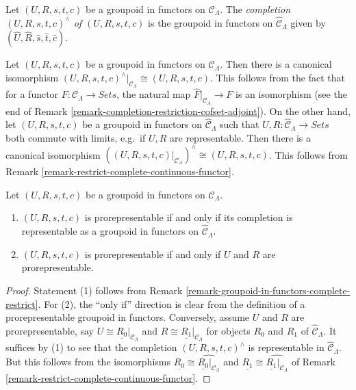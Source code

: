 \begin{definition}
\label{definition-completion-groupoud-in-functors}
Let $(U,R,s,t,c)$ be a groupoid in functors on $\mathcal{C}_\Lambda$.  The 
{\it completion $(U,R,s,t,c)^{\wedge}$ of $(U,R,s,t,c)$} is the groupoid in 
functors on $\widehat{\mathcal{C}}_\Lambda$ given by 
$(\widehat{U},\widehat{R},\widehat{s},\widehat{t},\widehat{c})$.
\end{definition}

\begin{remark}
\label{remark-groupoid-in-functors-complete-restrict}
Let $(U,R,s,t,c)$ be a groupoid in functors on $\mathcal{C}_\Lambda$. Then 
there is a canonical isomorphism $(U,R,s,t,c)^{\wedge}|_{\mathcal{C}_\Lambda} 
\cong (U,R,s,t,c)$.  This follows from the fact that for a functor $F: \mathcal 
C_\Lambda \to \textit{Sets}$, the natural map 
$\widehat{F}|_{\mathcal{C}_\Lambda} \to F$ is an isomorphism (see the 
end of Remark \ref{remark-completion-restriction-cofset-adjoint}).  On the 
other hand, let $(U,R,s,t,c)$ be a groupoid in functors on $\widehat{\mathcal 
C}_\Lambda$ such that $U, R: \widehat{\mathcal{C}}_\Lambda \to 
\textit{Sets}$ both commute with limits, e.g.\ if $U,R$ are 
representable. Then there is a canonical isomorphism $((U,R,s,t,c)|_{\mathcal 
C_\Lambda})^{\wedge} \cong (U,R,s,t,c)$. This follows from Remark 
\ref{remark-restrict-complete-continuous-functor}.
\end{remark}

\begin{lemma}
\label{lemma-groupoid-in-functors-prorep-equivalences}
Let $(U,R,s,t,c)$ be a groupoid in functors on $\mathcal{C}_\Lambda$.
\begin{enumerate}
\item $(U,R,s,t,c)$ is prorepresentable if and only if its completion is 
representable as a groupoid in functors on $\widehat{\mathcal{C}}_\Lambda$.
\item $(U,R,s,t,c)$ is prorepresentable if and only if $U$ and $R$ are 
prorepresentable.
\end{enumerate}
\end{lemma}

\begin{proof}
Statement (1) follows from Remark 
\ref{remark-groupoid-in-functors-complete-restrict}. For (2), the ``only if'' 
direction is clear from the definition of a prorepresentable groupoid in 
functors. Conversely, assume $U$ and $R$ are prorepresentable, say $U \cong 
\underline{R_0}|_{\mathcal{C}_\Lambda}$ and $R \cong 
\underline{R_1}|_{\mathcal{C}_\Lambda}$ for objects $R_0$ and $R_1$ of 
$\widehat{\mathcal{C}}_\Lambda$. It suffices by (1) to see that the completion 
$(U,R,s,t,c)^{\wedge}$ is representable in $\widehat{\mathcal{C}}_\Lambda$.  
But this follows from the isomorphisms $\underline{R_0} \cong 
\widehat{\underline{R_0}|_{\mathcal{C}_\Lambda}}$ and $\underline{R_1} \cong 
\widehat{\underline{R_1}|_{\mathcal{C}_\Lambda}}$ of Remark 
\ref{remark-restrict-complete-continuous-functor}.
\end{proof}

